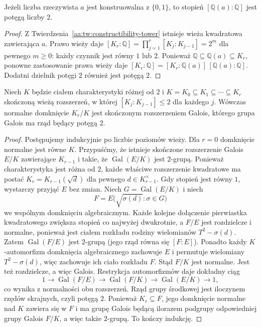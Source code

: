 \begin{wniosek}\label{aa:cor:constructibility-degree}
Jeżeli liczba rzeczywista $a$ jest konstruowalna z $\{0,1\}$, to stopień $[\mathbb Q(a):\mathbb Q]$ jest potęgą liczby $2$.
\end{wniosek}
\begin{proof}
Z Twierdzenia~\ref{aa:tw:constructibility-tower} istnieje
wieża kwadratowa zawierająca $a$. Prawo wieży daje
$[K_r:\mathbb Q]=\prod_{j=1}^r[K_j:K_{j-1}]=2^m$
dla pewnego $m\ge0$: każdy czynnik jest równy $1$ lub $2$.
Ponieważ $\mathbb Q\subseteq\mathbb Q(a)\subseteq K_r$,
ponowne zastosowanie prawa wieży daje
$[K_r:\mathbb Q]=[K_r:\mathbb Q(a)]\,[\mathbb Q(a):\mathbb Q]$.
Dodatni dzielnik potęgi $2$ również jest potęgą $2$.
\end{proof}
\begin{lemat}
\label{aa:lem:quadratic-tower-normal-closure}
Niech $K$ będzie ciałem charakterystyki różnej od $2$ i
$K=K_0\subseteq K_1\subseteq\cdots\subseteq K_r$
skończoną wieżą rozszerzeń, w której
$[K_j:K_{j-1}]\le2$ dla każdego $j$. Wówczas
normalne domknięcie $K_r/K$ jest skończonym rozszerzeniem
Galois, którego grupa Galois ma rząd będący potęgą $2$.
\end{lemat}
\begin{proof}
Postępujemy indukcyjnie po liczbie poziomów wieży.
Dla $r=0$ domknięcie normalne jest równe $K$.
Przypuśćmy, że istnieje skończone rozszerzenie Galois
$E/K$ zawierające $K_{r-1}$ i takie, że
$\operatorname{Gal}(E/K)$ jest $2$-grupą.
Ponieważ charakterystyka jest różna od $2$, każde
właściwe rozszerzenie kwadratowe ma postać
$K_r=K_{r-1}(\sqrt d)$ dla pewnego
$d\in K_{r-1}^{\times}$. Gdy stopień jest równy $1$,
wystarczy przyjąć $E$ bez zmian.
Niech $G=\operatorname{Gal}(E/K)$ i niech
\[
 F=E\bigl(\sqrt{\sigma(d)}:\sigma\in G\bigr)
\]
we wspólnym domknięciu algebraicznym. Każde kolejne
dołączenie pierwiastka kwadratowego zwiększa stopień
co najwyżej dwukrotnie, a $F/E$ jest rozdzielcze i normalne,
ponieważ jest ciałem rozkładu rodziny wielomianów
$T^2-\sigma(d)$. Zatem $\operatorname{Gal}(F/E)$
jest $2$-grupą (jego rząd równa się $[F:E]$).
Ponadto każdy $K$-automorfizm domknięcia algebraicznego
zachowuje $E$ i permutuje wielomiany $T^2-\sigma(d)$,
więc zachowuje ich ciało rozkładu $F$. Stąd $F/K$ jest
normalne. Jest też rozdzielcze, a więc Galois.
Restrykcja automorfizmów daje dokładny ciąg
\[
1\longrightarrow\operatorname{Gal}(F/E)
\longrightarrow\operatorname{Gal}(F/K)
\longrightarrow\operatorname{Gal}(E/K)
\longrightarrow1,
\]
co wynika z normalności obu rozszerzeń. Rząd grupy
środkowej jest iloczynem rzędów skrajnych, czyli potęgą $2$.
Ponieważ $K_r\subseteq F$, jego domknięcie normalne nad $K$
zawiera się w $F$ i ma grupę Galois będącą ilorazem
podgrupy odpowiedniej grupy Galois $F/K$, a więc także
$2$-grupą. To kończy indukcję.
\end{proof}

